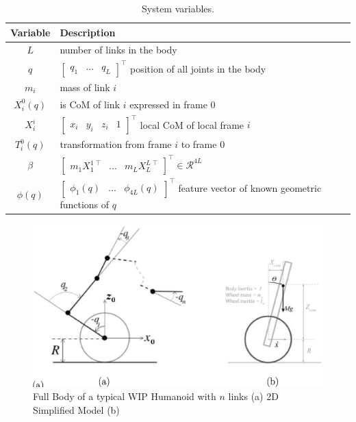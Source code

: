 \documentclass[letterpaper, 10 pt, conference]{ieeeconf}  %
\begin{document}
\begin{table}[b]
    \centering
    \caption{\label{tab:Variables}System variables.}
    \begin{tabular}{c|p{}}
    Variable & Description \\
    \hline
    $L$ & number of links in the body \\
    $q$ & $\begin{bmatrix} q_1 & ... & q_L \end{bmatrix}^\top$ position of all joints in the body \\
    $m_i$ & mass of link $i$ \\
    $X_i^0(q)$ & is CoM of link $i$ expressed in frame $0$ \\
    $X_i^i$ & $\begin{bmatrix} x_i & y_i & z_i & 1 \end{bmatrix}^\top$ local CoM of local frame $i$ \\
    $T_{i}^{0}(q)$ & transformation from frame $i$ to frame $0$ \\
    $\beta$ & $\begin{bmatrix} m_1X_1^{1\;\top} & ... & m_L X_L^{L\;\top} \end{bmatrix}^\top \in \mathcal{R}^{4L}$ \\
    $\phi(q)$ & $\begin{bmatrix} \phi_1(q) & ... & \phi_{4L}(q) \end{bmatrix}^\top$ feature vector of known geometric functions of $q$ \\
    \end{tabular}
\end{table}

\begin{figure}[htb]
	\centering
	\includegraphics[width=0.9\columnwidth]{figs/System2.eps}
    \vspace{-.5\baselineskip}
    \caption{Full Body of a typical WIP Humanoid with $n$ links (a) 2D Simplified Model (b)}
    \label{fig: system}
\end{figure}
\end{document}
